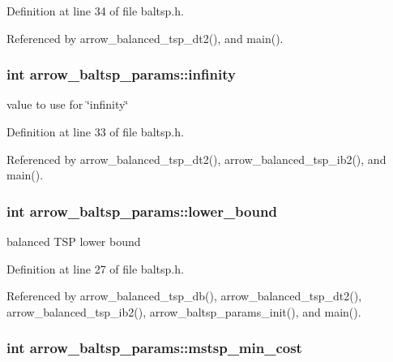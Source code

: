 Definition at line 34 of file baltsp.h.

Referenced by arrow\_\-balanced\_\-tsp\_\-dt2(), and main().\hypertarget{structarrow__baltsp__params_facdd37c1df03423ac58a84019ddedf3}{
\subsubsection[{infinity}]{\setlength{\rightskip}{0pt plus 5cm}int {\bf arrow\_\-baltsp\_\-params::infinity}}}
\label{structarrow__baltsp__params_facdd37c1df03423ac58a84019ddedf3}


value to use for \char`\"{}infinity\char`\"{} 

Definition at line 33 of file baltsp.h.

Referenced by arrow\_\-balanced\_\-tsp\_\-dt2(), arrow\_\-balanced\_\-tsp\_\-ib2(), and main().\hypertarget{structarrow__baltsp__params_0b0ba660a5908a16839b024dc3469c11}{
\subsubsection[{lower\_\-bound}]{\setlength{\rightskip}{0pt plus 5cm}int {\bf arrow\_\-baltsp\_\-params::lower\_\-bound}}}
\label{structarrow__baltsp__params_0b0ba660a5908a16839b024dc3469c11}


balanced TSP lower bound 

Definition at line 27 of file baltsp.h.

Referenced by arrow\_\-balanced\_\-tsp\_\-db(), arrow\_\-balanced\_\-tsp\_\-dt2(), arrow\_\-balanced\_\-tsp\_\-ib2(), arrow\_\-baltsp\_\-params\_\-init(), and main().\hypertarget{structarrow__baltsp__params_bead1abd279aeeb7af8e59538df09118}{
\subsubsection[{mstsp\_\-min\_\-cost}]{\setlength{\rightskip}{0pt plus 5cm}int {\bf arrow\_\-baltsp\_\-params::mstsp\_\-min\_\-cost}}}
\label{structarrow__baltsp__params_bead1abd279aeeb7af8e59538df09118}


